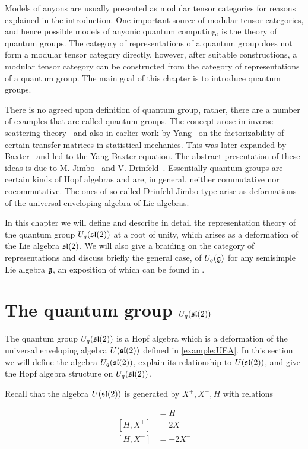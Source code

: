 Models of anyons are usually presented as modular
tensor categories for reasons explained in the introduction.  One important
source
of modular tensor categories, and hence possible models of anyonic quantum
computing, is the theory of quantum groups.  The category of representations of a quantum
group does not form a modular tensor category directly, however, after suitable
constructions, a modular tensor category can be constructed from the category
of representations of a quantum group.  The main goal of this chapter is to
introduce quantum groups.

There is no agreed upon definition of quantum group, rather, there are a
number of examples that are called quantum groups.  The concept arose in
inverse scattering theory~\cite{Faddeev79} and also in earlier work by
Yang~\cite{Yang67} on the factorizability of certain transfer matrices in
statistical mechanics.  This was later expanded by Baxter~\cite{Baxter82}
and led to the Yang-Baxter equation.  The abstract presentation of these
ideas is due to M. Jimbo~\cite{Jimbo85} and V. Drinfeld~\cite{Drinfeld86}.
Essentially quantum groups are certain kinds of Hopf algebras and are, in
general, neither commutative nor cocommutative.  The ones of so-called
Drinfeld-Jimbo type arise as deformations of the universal enveloping
algebra of Lie algebras.

In this chapter we will define and describe in detail the representation theory
of the quantum group $U_q(\mathfrak{sl}(2))$ at a root of unity, which arises as a
deformation of the Lie algebra $\mathfrak{sl}(2)$. We will also give a braiding on the
category of representations and discuss briefly the general case, of
$U_q(\mathfrak{g})$ for any semisimple Lie algebra $\mathfrak{g}$, an exposition of which
can be found in \cite{CP}.

\section{The quantum group $U_q(\mathfrak{sl}(2))$}
\label{UqSL2}


The quantum group $U_q(\mathfrak{sl}(2))$ is a Hopf algebra which is a deformation of the
universal enveloping algebra $U(\mathfrak{sl}(2))$ defined in \ref{example:UEA}.  In this
section we will define the algebra $U_q(\mathfrak{sl}(2))$, explain its relationship to 
$U(\mathfrak{sl}(2))$, and give the Hopf algebra structure on $U_q(\mathfrak{sl}(2))$.

Recall that the algebra $U(\mathfrak{sl}(2))$ is generated by $X^+,X^-,H$ with relations

\begin{align}
[X^+,X^-] & = H \\ 
[H,X^+] &= 2X^+ \\
[H,X^-] &= -2X^- 
\end{align}

